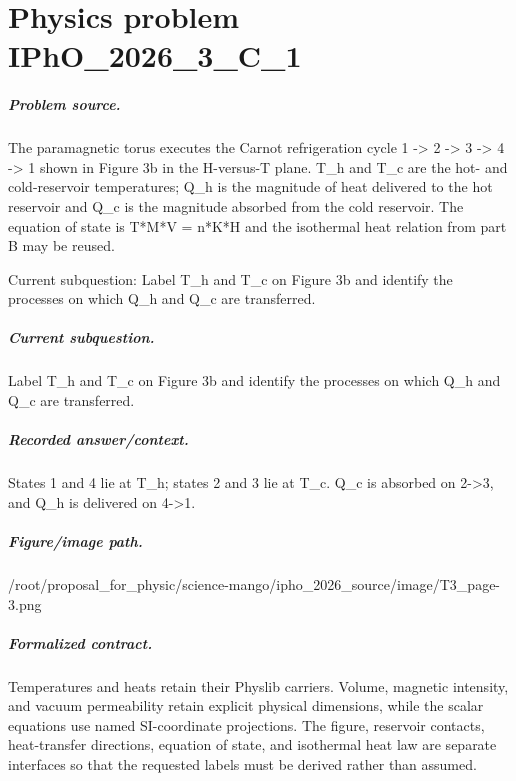 
\chapter{Physics problem IPhO\_2026\_3\_C\_1}
\label{ch:IPhO2026Problems_problem_IPhO_2026_3_C_1}

\paragraph{Problem source.}
The paramagnetic torus executes the Carnot refrigeration cycle
1 -> 2 -> 3 -> 4 -> 1 shown in Figure 3b in the H-versus-T plane.  T\_h and T\_c
are the hot- and cold-reservoir temperatures; Q\_h is the magnitude of heat
delivered to the hot reservoir and Q\_c is the magnitude absorbed from the cold
reservoir.  The equation of state is T*M*V = n*K*H and the isothermal heat
relation from part B may be reused.

Current subquestion:
Label T\_h and T\_c on Figure 3b and identify the processes on which Q\_h and Q\_c are transferred.

\paragraph{Current subquestion.}
Label T\_h and T\_c on Figure 3b and identify the processes on which Q\_h and Q\_c are transferred.

\paragraph{Recorded answer/context.}
States 1 and 4 lie at T\_h; states 2 and 3 lie at T\_c. Q\_c is absorbed on 2->3, and Q\_h is delivered on 4->1.

\paragraph{Figure/image path.}
/root/proposal\_for\_physic/science-mango/ipho\_2026\_source/image/T3\_page-3.png

\paragraph{Formalized contract.}
Temperatures and heats retain their Physlib carriers.  Volume, magnetic
intensity, and vacuum permeability retain explicit physical dimensions, while
the scalar equations use named SI-coordinate projections.  The figure,
reservoir contacts, heat-transfer directions, equation of state, and
isothermal heat law are separate interfaces so that the requested labels must
be derived rather than assumed.

